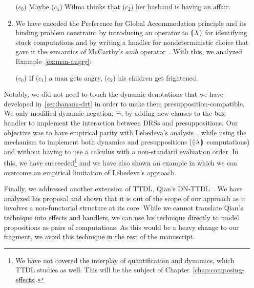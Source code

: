 \begin{enumerate}
  \begin{exe}
     ($c_0$) Maybe ($c_1$) Wilma thinks that ($c_2$) her husband is having an affair.
  \end{exe}

\item \label{item:pga-amb} We have encoded the Preference for Global
  Accommodation principle and its binding problem constraint by introducing
  an operator to $\llparenthesis \, \lambda \, \rrparenthesis$ for identifying stuck computations and
  by writing a handler for nondeterministic choice that gave it the
  semantics of McCarthy's $amb$ operator~\cite{mccarthy1961basis}. With
  this, we analyzed Example~\ref{ex:man-angry}:

  \begin{exe}
     ($c_0$) If ($c_1$) a man gets angry, ($c_2$) his
    children get frightened.
  \end{exe}
\end{enumerate}

Notably, we did not need to touch the dynamic denotations that we have
developed in~\ref{sec:banana-drt} in order to make them
presupposition-compatible. We only modified dynamic negation, $\mathop{\overline{\lnot}}$, by
adding new clauses to the $\mathrm{box}$ handler to implement the interaction
between DRSs and presuppositions. Our objective was to have empirical
parity with Lebedeva's analysis~\cite{lebedeva2012expression}, while using
the mechanism to implement both dynamics and presuppositions (${\llparenthesis \, \lambda \, \rrparenthesis}$
computations) and without having to use a calculus with a non-standard
evaluation order. In this, we have succeeded\footnote{We have not covered
  the interplay of quantification and dynamics, which TTDL studies as
  well. This will be the subject of Chapter~\ref{chap:composing-effects}.}
and we have also shown an example in which we can overcome an empirical
limitation of Lebedeva's approach.

Finally, we addressed another extension of TTDL, Qian's
DN-TTDL~\cite{qian2014accessibility}. We have analyzed his proposal and
shown that it is out of the scope of our approach as it involves a
non-functorial structure at its core. While we cannot translate Qian's
technique into effects and handlers, we can use his technique directly to
model propositions as pairs of computations. As this would be a heavy
change to our fragment, we avoid this technique in the rest of the
manuscript.
